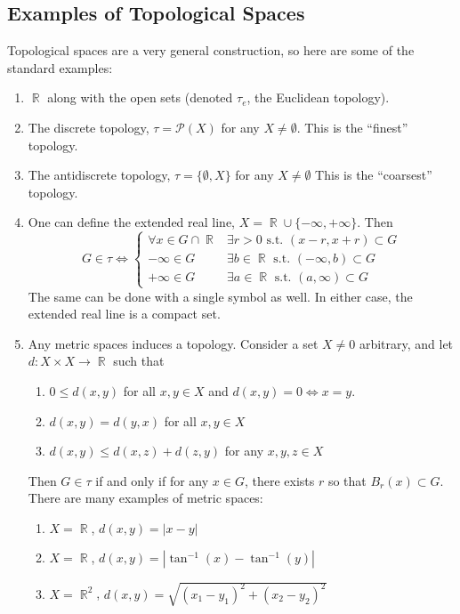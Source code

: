\documentclass[12pt, a4paper]{book}
\DeclareMathOperator{\R}{\mathbb{R}}
\theoremstyle{nonumberplain}
\begin{document}
\subsection{Examples of Topological Spaces}
Topological spaces are a very general construction, so here are some of the standard examples:
\begin{enumerate}
    \item $\R$ along with the open sets (denoted $\tau_e$, the Euclidean topology).
    \item The discrete topology, $\tau=\mathcal{P}(X)$ for any $X\neq\emptyset$.
        This is the ``finest'' topology.
    \item The antidiscrete topology, $\tau=\{\emptyset,X\}$ for any $X\neq\emptyset$
        This is the ``coarsest'' topology.
    \item One can define the extended real line, $X=\R\cup\{-\infty,+\infty\}$.
        Then
        \[G\in\tau\Leftrightarrow
            \begin{cases}
                \forall x\in G\cap\R & \exists r>0 \text{ s.t. } (x-r,x+r)\subset G\\
                -\infty\in G & \exists b\in\R \text{ s.t. }(-\infty,b)\subset G\\
                +\infty\in G & \exists a\in\R \text{ s.t. }(a,\infty)\subset G
            \end{cases}
        \]
        The same can be done with a single symbol as well.
        In either case, the extended real line is a compact set.
    \item Any metric spaces induces a topology.
        Consider a set $X\neq 0$ arbitrary, and let $d:X\times X\to\R$ such that
        \begin{enumerate}
            \item $0\leq d(x,y)$ for all $x,y\in X$ and $d(x,y)=0\Leftrightarrow x=y$.
            \item $d(x,y)=d(y,x)$ for all $x,y\in X$
            \item $d(x,y)\leq d(x,z)+d(z,y)$ for any $x,y,z\in X$
        \end{enumerate}
        Then $G\in \tau$ if and only if for any $x\in G$, there exists $r$ so that $B_r(x)\subset G$.
        There are many examples of metric spaces:
        \begin{enumerate}
            \item $X=\R$, $d(x,y)=|x-y|$
            \item $X=\R$, $d(x,y)=|\tan^{-1}(x)-\tan^{-1}(y)|$
            \item $X=\R^2$, $d(x,y)=\sqrt{(x_1-y_1)^2+(x_2-y_2)^2}$

\end{enumerate}
\end{enumerate}
\end{document}
